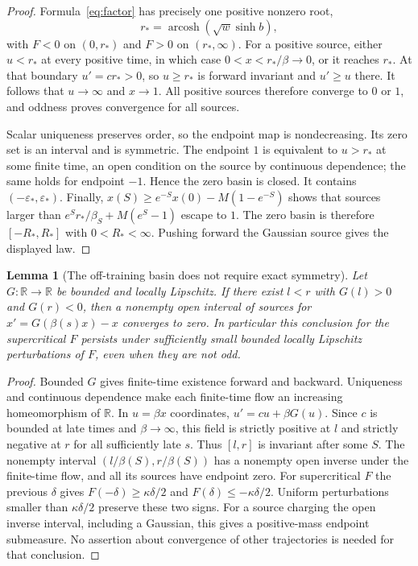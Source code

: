 \documentclass[11pt]{article}
\newtheorem{lemma}{Lemma}
\newcommand{\R}{\mathbb R}
\newcommand{\eps}{\varepsilon}
\begin{document}
\begin{proof}
Formula~\eqref{eq:factor} has precisely one positive nonzero root,
\[
 r_*=\operatorname{arcosh}(\sqrt w\sinh b),
\]
with $F<0$ on $(0,r_*)$ and $F>0$ on $(r_*,\infty)$.
For a positive source, either $u<r_*$ at every positive time, in which
case $0<x<r_*/\beta\to0$, or it reaches $r_*$. At that boundary
$u'=cr_*>0$, so $u\ge r_*$ is forward invariant and $u'\ge u$ there.
It follows that $u\to\infty$ and $x\to1$. All positive sources therefore
converge to $0$ or $1$, and oddness proves convergence for all sources.

Scalar uniqueness preserves order, so the endpoint map is nondecreasing.
Its zero set is an interval and is symmetric. The endpoint $1$ is equivalent
to $u>r_*$ at some finite time, an open condition on the source by continuous
dependence; the same holds for endpoint $-1$. Hence the zero basin is closed.
It contains $(-\eps_*,\eps_*)$. Finally,
$x(S)\ge e^{-S}x(0)-M(1-e^{-S})$ shows that sources larger than
$e^S r_*/\beta_S+M(e^S-1)$ escape to $1$. The zero basin is therefore
$[-R_*,R_*]$ with $0<R_*<\infty$. Pushing forward the Gaussian source gives
the displayed law.
\end{proof}

\begin{lemma}[The off-training basin does not require exact symmetry]\label{lem:tube}
Let $G:\R\to\R$ be bounded and locally Lipschitz. If there exist $l<r$
with $G(l)>0$ and $G(r)<0$, then a nonempty open interval of sources for
$x'=G(\beta(s)x)-x$ converges to zero. In particular this conclusion for
the supercritical $F$ persists under sufficiently small bounded locally
Lipschitz perturbations of $F$, even when they are not odd.
\end{lemma}
\begin{proof}
Bounded $G$ gives finite-time existence forward and backward. Uniqueness and
continuous dependence make each finite-time flow an increasing homeomorphism
of $\R$. In $u=\beta x$ coordinates, $u'=cu+\beta G(u)$. Since $c$ is
bounded at late times and $\beta\to\infty$, this field is strictly positive
at $l$ and strictly negative at $r$ for all sufficiently late $s$. Thus
$[l,r]$ is invariant after some $S$. The nonempty interval
$(l/\beta(S),r/\beta(S))$ has a nonempty open inverse under the finite-time
flow, and all its sources have endpoint zero. For supercritical $F$ the
previous $\delta$ gives $F(-\delta)\ge\kappa\delta/2$ and
$F(\delta)\le-\kappa\delta/2$. Uniform perturbations smaller than
$\kappa\delta/2$ preserve these two signs. For a source charging the open
inverse interval, including a Gaussian, this gives a positive-mass endpoint
submeasure. No assertion about convergence of other trajectories is needed
for that conclusion.
\end{proof}
\end{document}
